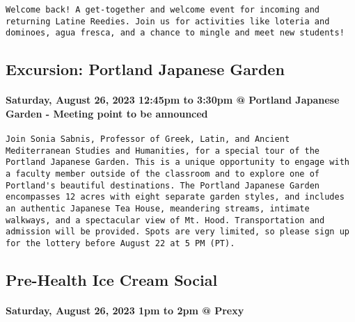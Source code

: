 \documentclass[
]{article}
\begin{document}
\begin{verbatim}
Welcome back! A get-together and welcome event for incoming and returning Latine Reedies. Join us for activities like loteria and dominoes, agua fresca, and a chance to mingle and meet new students!
\end{verbatim}

\hypertarget{excursion-portland-japanese-garden}{%
\subsection{Excursion: Portland Japanese
Garden}\label{excursion-portland-japanese-garden}}

\hypertarget{saturday-august-26-2023-1245pm-to-330pm-portland-japanese-garden---meeting-point-to-be-announced}{%
\paragraph{Saturday, August 26, 2023 12:45pm to 3:30pm @ Portland
Japanese Garden - Meeting point to be
announced}\label{saturday-august-26-2023-1245pm-to-330pm-portland-japanese-garden---meeting-point-to-be-announced}}

\begin{verbatim}
Join Sonia Sabnis, Professor of Greek, Latin, and Ancient Mediterranean Studies and Humanities, for a special tour of the Portland Japanese Garden. This is a unique opportunity to engage with a faculty member outside of the classroom and to explore one of Portland's beautiful destinations. The Portland Japanese Garden encompasses 12 acres with eight separate garden styles, and includes an authentic Japanese Tea House, meandering streams, intimate walkways, and a spectacular view of Mt. Hood. Transportation and admission will be provided. Spots are very limited, so please sign up for the lottery before August 22 at 5 PM (PT).
\end{verbatim}

\hypertarget{pre-health-ice-cream-social}{%
\subsection{Pre-Health Ice Cream
Social}\label{pre-health-ice-cream-social}}

\hypertarget{saturday-august-26-2023-1pm-to-2pm-prexy}{%
\paragraph{Saturday, August 26, 2023 1pm to 2pm @
Prexy}\label{saturday-august-26-2023-1pm-to-2pm-prexy}}
\end{document}
